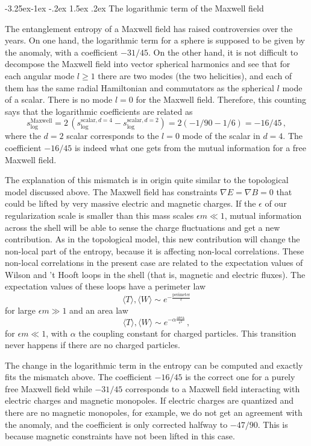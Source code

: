 \documentclass[11pt]{article}
\makeatletter
\renewcommand\subsection{\@startsection{subsection}{2}{\z@}%
                                   {-3.25ex\@plus -1ex \@minus -.2ex}%
                                     {1.5ex \@plus .2ex}%
                                     {\normalfont\bfseries}}
\numberwithin{equation}{section}
\newcommand{\be}{\begin{equation}}
\newcommand{\ee}{\end{equation}}
\makeatother
\begin{document}
\subsection{The logarithmic term of the Maxwell field}

The entanglement entropy of a Maxwell field has raised controversies over the years.  
On one hand, the logarithmic term for a sphere is supposed to be given by the anomaly, with a coefficient $-31/45$. On the other hand, it is not difficult to decompose the  Maxwell field into vector spherical harmonics and see that for each angular mode $l\ge 1$ there are two modes (the two helicities), and each of them has the same radial Hamiltonian and commutators as the spherical $l$ mode of a scalar. There is no mode $l=0$ for the Maxwell field.  Therefore, this counting says that the logarithmic coefficients are related as 
\be
s^{\textrm{Maxwell}}_{\textrm{log}}=2\,(s^{\textrm{scalar}, d=4}_{\textrm{log}}- s^{\textrm{scalar}, d=2}_{\textrm{log}})=2(-1/90-1/6)=-16/45\,,   
\ee
where the $d=2$ scalar corresponds to the $l=0$ mode of the scalar in $d=4$. 
The coefficient $-16/45$ is indeed what one gets from the mutual information for a free Maxwell field.

The explanation of this mismatch is in origin quite similar to the topological model discussed above. The Maxwell field has constraints $\nabla E=\nabla B=0$ that could be lifted by very massive electric and magnetic charges. If the $\epsilon$ of our regularization scale is smaller than this mass scales $\epsilon m\ll 1$, mutual information across the shell will be able to sense the charge fluctuations and get a new contribution. As in the topological model, this new contribution will change the non-local part of the entropy, because it is affecting non-local correlations. These non-local correlations in the present case are related to the expectation values of Wilson and 't Hooft loops in the shell (that is, magnetic and electric fluxes). The expectation values of these loops have a perimeter law
\be\label{perr}
\langle T \rangle,\langle W \rangle \sim e^{-\frac{\textrm{perimeter}}{\epsilon}}
\ee  
for large $\epsilon m \gg 1$ and an area law 
\be \label{arr}
\langle T \rangle,\langle W \rangle \sim e^{-\alpha \frac{\textrm{area}}{\epsilon^2}}\,,
\ee 
for $\epsilon m \ll 1$, with $\alpha$ the coupling constant for charged particles. This transition never happens if there are no charged particles. 

The change in the logarithmic term in the entropy can be computed and exactly fits the mismatch above. The coefficient $-16/45$ is the correct one for a purely free Maxwell field while $-31/45$ corresponds to a Maxwell field interacting with electric charges and magnetic monopoles. If electric charges are quantized and there are no magnetic monopoles, for example, we do not get an agreement with the anomaly, and the coefficient is only corrected halfway to $-47/90$. This is because magnetic constraints have not been lifted in this case.  
\end{document}
